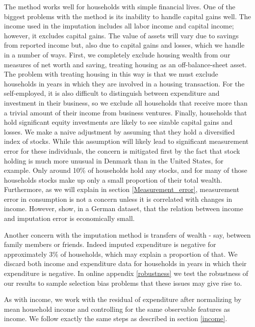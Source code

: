 \documentclass[titlepage]{\econtex}\newcommand{\texname}{ConsumptionHeterogeneity}
\begin{document}
The method works well for households with simple financial lives. One of the biggest problems with the method is its inability to handle capital gains well. The income used in the imputation includes all labor income and capital income; however, it excludes capital gains. The value of assets will vary due to savings from reported income but, also due to capital gains and losses, which we handle in a number of ways. First, we completely exclude housing wealth from our measures of net worth and saving, treating housing as an off-balance-sheet asset. The problem with treating housing in this way is that we must exclude households in years in which they are involved in a housing transaction. For the self-employed, it is also difficult to distinguish between expenditure and investment in their business, so we exclude all households that receive more than a trivial amount of their income from business ventures. Finally, households that hold significant equity investments are likely to see sizable capital gains and losses. We make a naive adjustment by assuming that they hold a diversified index of stocks. While this assumption will likely lead to significant measurement error for these individuals, the concern is mitigated first by the fact that stock holding is much more unusual in Denmark than in the United States, for example. Only around 10\% of households hold any stocks, and for many of those households stocks make up only a small proportion of their total wealth. Furthermore, as we will explain in section \ref{Measurement_error}, measurement error in consumption is not a concern unless it is correlated with changes in income. However, \cite{baker_measurement_2018} show, in a German dataset, that the relation between income and imputation error is economically small. 

Another concern with the imputation method is transfers of wealth - say, between family members or friends. Indeed imputed expenditure is negative for approximately 3\% of households, which may explain a proportion of that. We discard both income and expenditure data for households in years in which their expenditure is negative. In online appendix \ref{robustness} we test the robustness of our results to sample selection bias problems that these issues may give rise to.

As with income, we work with the residual of expenditure after normalizing by mean household income and controlling for the same observable features as income. We follow exactly the same steps as described in section \ref{income}.
\end{document}
